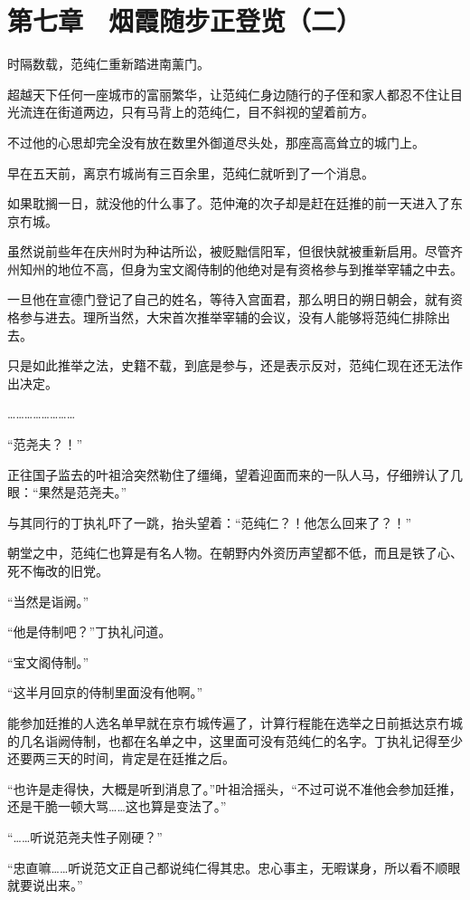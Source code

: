 \section{第七章　烟霞随步正登览（二）}

时隔数载，范纯仁重新踏进南薰门。

超越天下任何一座城市的富丽繁华，让范纯仁身边随行的子侄和家人都忍不住让目光流连在街道两边，只有马背上的范纯仁，目不斜视的望着前方。

不过他的心思却完全没有放在数里外御道尽头处，那座高高耸立的城门上。

早在五天前，离京冇城尚有三百余里，范纯仁就听到了一个消息。

如果耽搁一日，就没他的什么事了。范仲淹的次子却是赶在廷推的前一天进入了东京冇城。

虽然说前些年在庆州时为种诂所讼，被贬黜信阳军，但很快就被重新启用。尽管齐州知州的地位不高，但身为宝文阁侍制的他绝对是有资格参与到推举宰辅之中去。

一旦他在宣德门登记了自己的姓名，等待入宫面君，那么明日的朔日朝会，就有资格参与进去。理所当然，大宋首次推举宰辅的会议，没有人能够将范纯仁排除出去。

只是如此推举之法，史籍不载，到底是参与，还是表示反对，范纯仁现在还无法作出决定。

……………………

“范尧夫？！”

正往国子监去的叶祖洽突然勒住了缰绳，望着迎面而来的一队人马，仔细辨认了几眼：“果然是范尧夫。”

与其同行的丁执礼吓了一跳，抬头望着：“范纯仁？！他怎么回来了？！”

朝堂之中，范纯仁也算是有名人物。在朝野内外资历声望都不低，而且是铁了心、死不悔改的旧党。

“当然是诣阙。”

“他是侍制吧？”丁执礼问道。

“宝文阁侍制。”

“这半月回京的侍制里面没有他啊。”

能参加廷推的人选名单早就在京冇城传遍了，计算行程能在选举之日前抵达京冇城的几名诣阙侍制，也都在名单之中，这里面可没有范纯仁的名字。丁执礼记得至少还要两三天的时间，肯定是在廷推之后。

“也许是走得快，大概是听到消息了。”叶祖洽摇头，“不过可说不准他会参加廷推，还是干脆一顿大骂……这也算是变法了。”

“……听说范尧夫性子刚硬？”

“忠直嘛……听说范文正自己都说纯仁得其忠。忠心事主，无暇谋身，所以看不顺眼就要说出来。”

